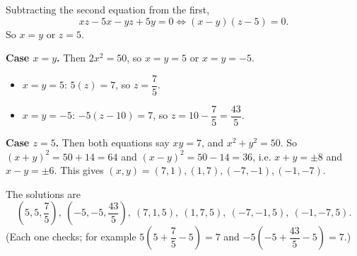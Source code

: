 Subtracting the second equation from the first,
\[xz-5x-yz+5y=0\iff(x-y)(z-5)=0.\]
So $x=y$ or $z=5$.

\textbf{Case $x=y$.} Then $2x^2=50$, so $x=y=5$ or $x=y=-5$.
\begin{itemize}
\item $x=y=5$: $5(z)=7$, so $z=\dfrac75$.
\item $x=y=-5$: $-5(z-10)=7$, so $z=10-\dfrac75=\dfrac{43}{5}$.
\end{itemize}

\textbf{Case $z=5$.} Then both equations say $xy=7$, and $x^2+y^2=50$. So $(x+y)^2=50+14=64$ and $(x-y)^2=50-14=36$, i.e. $x+y=\pm8$ and $x-y=\pm6$. This gives $(x,y)=(7,1),(1,7),(-7,-1),(-1,-7)$.

The solutions are
\[\boxed{\left(5,5,\dfrac75\right),\ \left(-5,-5,\dfrac{43}5\right),\ (7,1,5),\ (1,7,5),\ (-7,-1,5),\ (-1,-7,5)}.\]
(Each one checks; for example $5\left(5+\dfrac75-5\right)=7$ and $-5\left(-5+\dfrac{43}5-5\right)=7$.)
